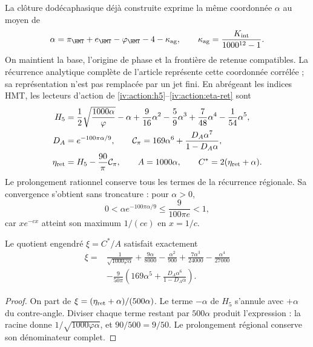 La clôture dodécaphasique déjà construite exprime la même coordonnée \(\alpha\) au moyen de
\[
 \alpha=\pi_{\HMT}+e_{\HMT}-\varphi_{\HMT}-4-\kappa_{\rm ag},
 \qquad \kappa_{\rm ag}=\frac{K_{\rm int}}{1000^{12}-1}.
\]
On maintient la base, l’origine de phase et la frontière de retenue compatibles. La récurrence analytique complète de l’article représente cette coordonnée corrélée ; sa représentation n’est pas remplacée par un jet fini. En abrégeant les indices HMT, les lecteurs d’action de \eqref{iv:action:h5}--\eqref{iv:action:eta-ret} sont
\begin{align}
 H_5&=\frac12\sqrt{\frac{1000\alpha}{\varphi}}-\alpha
       +\frac9{16}\alpha^2-\frac59\alpha^3
       +\frac7{48}\alpha^4-\frac1{54}\alpha^5,\nonumber\\
 D_A&=e^{-100\pi\alpha/9},\qquad
 \mathcal C_\pi=169\alpha^6+\frac{D_A\alpha^7}{1-D_A\alpha},\nonumber\\
 \eta_{\rm ret}&=H_5-\frac{90}{\pi}\mathcal C_\pi,
 \qquad A=1000\alpha,\qquad C^*=2(\eta_{\rm ret}+\alpha).
 \label{rec:eq:lectores-completos}
\end{align}
Le prolongement rationnel conserve tous les termes de la récurrence régionale. Sa convergence s'obtient sans troncature : pour \(\alpha>0\),
\[
 0<\alpha e^{-100\pi\alpha/9}\le\frac9{100\pi e}<1,
\]
car \(xe^{-cx}\) atteint son maximum \(1/(ce)\) en \(x=1/c\).


\begin{proposition}
\label{rec:prop:sustitucion}
Le quotient engendré \(\xi=C^*/A\) satisfait exactement
\begin{align}
 \xi={}&\frac1{\sqrt{1000\varphi\alpha}}
 +\frac{9\alpha}{8000}-\frac{\alpha^2}{900}
 +\frac{7\alpha^3}{24000}-\frac{\alpha^4}{27000}\nonumber\\
 &-\frac9{50\pi}
 \left(169\alpha^5+\frac{D_A\alpha^6}{1-D_A\alpha}\right).
 \label{rec:eq:xi-completa}
\end{align}
\end{proposition}
\begin{proof}
On part de \(\xi=(\eta_{\rm ret}+\alpha)/(500\alpha)\). Le terme \(-\alpha\) de \(H_5\) s’annule avec \(+\alpha\) du contre-angle. Diviser chaque terme restant par \(500\alpha\) produit l’expression : la racine donne \(1/\sqrt{1000\varphi\alpha}\), et \(90/500=9/50\). Le prolongement régional conserve son dénominateur complet.

\end{proof}


